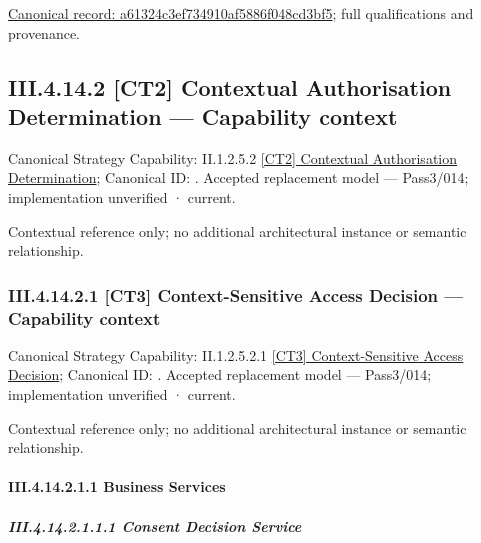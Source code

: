 {\footnotesize \href{../../../../../../../continuum/business/business-function/a61324c3ef734910af5886f048cd3bf5.md}{Canonical record: a61324c3ef734910af5886f048cd3bf5}; full qualifications and provenance.}\par
\subsection*{III.4.14.2 [CT2] Contextual Authorisation Determination — Capability context}
\label{navigation:III.4.14.2}

{\small Canonical Strategy Capability: II.1.2.5.2 \hyperref[element:c8bd1d6e0796442a934a74cc69077543]{[CT2] Contextual Authorisation Determination}; Canonical ID: \texttt{}. Accepted replacement model — Pass3/014; implementation unverified · current.}\par
Contextual reference only; no additional architectural instance or semantic relationship.\par
\subsubsection*{III.4.14.2.1 [CT3] Context-Sensitive Access Decision — Capability context}
\label{navigation:III.4.14.2.1}

{\small Canonical Strategy Capability: II.1.2.5.2.1 \hyperref[element:8719d8ed49f940cfbba2d26ae14ea54d]{[CT3] Context-Sensitive Access Decision}; Canonical ID: \texttt{}. Accepted replacement model — Pass3/014; implementation unverified · current.}\par
Contextual reference only; no additional architectural instance or semantic relationship.\par
\paragraph*{III.4.14.2.1.1 Business Services}
\label{navigation:III.4.14.2.1.1}

\subparagraph*{III.4.14.2.1.1.1 Consent Decision Service}
\label{navigation:III.4.14.2.1.1.1}

